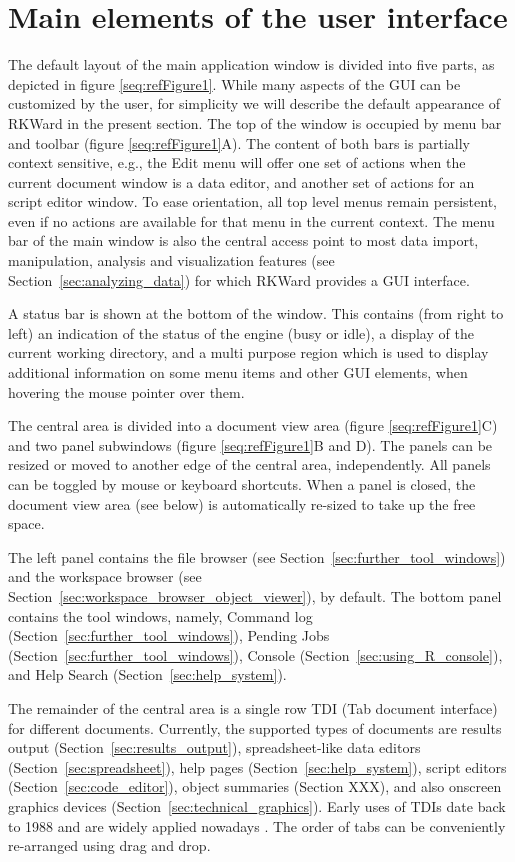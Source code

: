 \section{Main elements of the user interface}
\label{sec:user_interface}
The default layout of the main application window is divided into five
parts, as depicted in figure \ref{seq:refFigure1}. While many aspects
of the GUI can be customized by the user, for simplicity we will
describe the default appearance of RKWard in the present section. The
top of the window is occupied by menu bar and toolbar (figure
\ref{seq:refFigure1}A). The content of both bars is partially context
sensitive, e.g., the Edit menu will offer
one set of actions when the current document window is a data editor,
and another set of actions for an  script
editor window. To ease orientation, all top level menus remain
persistent, even if no actions are available for that menu in the
current context. The menu bar of the main window is also the central
access point to most data import, manipulation, analysis and
visualization features (see Section~\ref{sec:analyzing_data}) for which RKWard provides a GUI
interface.

A status bar is shown at the bottom of the window. This contains (from
right to left) an indication of the status of the
 engine (busy or idle), a display of the
current working directory, and a multi purpose region which is used to
display additional information on some menu items and other GUI
elements, when hovering the mouse pointer over them.

The central area is divided into a document view area (figure
\ref{seq:refFigure1}C) and two panel subwindows (figure
\ref{seq:refFigure1}B and D). The panels can be resized or moved to
another edge of the central area, independently. All panels can be
toggled by mouse or keyboard shortcuts. When a panel is closed, the
document view area (see below) is automatically re-sized to take up the
free space.

The left panel contains the file browser (see Section~\ref{sec:further_tool_windows}) and the
workspace browser (see Section~\ref{sec:workspace_browser_object_viewer}), by default. The
bottom panel contains the tool windows, namely, Command
log (Section~\ref{sec:further_tool_windows}), Pending Jobs (Section~\ref{sec:further_tool_windows}),  Console
(Section~\ref{sec:using_R_console}), and Help Search (Section~\ref{sec:help_system}).

The remainder of the central area is a single row TDI (Tab document
interface) for different documents. Currently, the supported types of
documents are results output (Section~\ref{sec:results_output}), spreadsheet-like data editors
(Section~\ref{sec:spreadsheet}), help pages (Section~\ref{sec:help_system}), script editors (Section~\ref{sec:code_editor}), object summaries (Section XXX), and also
 onscreen graphics devices (Section~\ref{sec:technical_graphics}). Early uses of TDIs date back to 1988 and are
widely applied nowadays \citep{Hopkins2005, MDN2010,
KimLutteroth2010}. The order of tabs can be conveniently re-arranged
using drag and drop.

